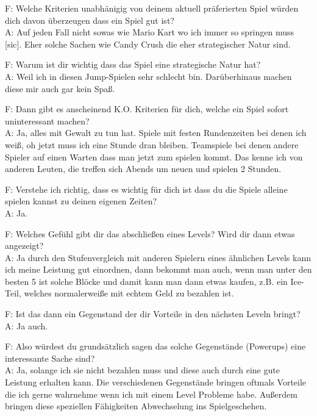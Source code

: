 \documentclass[12pt, a4paper]{article}
\begin{document}
\begin{flushleft}
F: Welche Kriterien unabhänigig von deinem aktuell präferierten Spiel würden dich davon überzeugen dass ein Spiel gut ist?\\
A: Auf jeden Fall nicht sowas wie Mario Kart wo ich immer so springen muss [sic]. Eher solche Sachen wie Candy Crush die eher strategischer Natur sind.\newline

F: Warum ist dir wichtig dass das Spiel eine strategische Natur hat?\\
A: Weil ich in diesen Jump-Spielen sehr schlecht bin. Darüberhinaus machen diese mir auch gar kein Spaß.\newline

F: Dann gibt es anscheinend K.O. Kriterien für dich, welche ein Spiel sofort uninteressant machen?\\
A: Ja, alles mit Gewalt zu tun hat. Spiele mit festen Rundenzeiten bei denen ich weiß, oh jetzt muss ich eine Stunde dran bleiben. Teamspiele bei denen andere Spieler auf einen Warten dass man jetzt zum spielen kommt. Das kenne ich von anderen Leuten, die treffen sich Abends um neuen und spielen 2 Stunden.\newline

F: Verstehe ich richtig, dass es wichtig für dich ist dass du die Spiele alleine spielen kannst zu deinen eigenen Zeiten?\\
A: Ja.\newline

F: Welches Gefühl gibt dir das abschließen eines Levels? Wird dir dann etwas angezeigt?\\
A: Ja durch den Stufenvergleich mit anderen Spielern eines ähnlichen Levels kann ich meine Leistung gut einordnen, dann bekommt man auch, wenn man unter den besten 5 ist solche Blöcke und damit kann man dann etwas kaufen, z.B. ein Ice-Teil, welches normalerweiße mit echtem Geld zu bezahlen ist.\newline

F: Ist das dann ein Gegenstand der dir Vorteile in den nächsten Leveln bringt?\\
A: Ja auch.\newline

F: Also würdest du grundsätzlich sagen das solche Gegenstände (Powerups) eine interessante Sache sind?\\
A: Ja, solange ich sie nicht bezahlen muss und diese auch durch eine gute Leistung erhalten kann. Die verschiedenen Gegenstände bringen oftmals Vorteile die ich gerne wahrnehme wenn ich mit einem Level Probleme habe. Außerdem bringen diese speziellen Fähigkeiten Abwechselung ins Spielgeschehen.\newline


\end{flushleft}
\end{document}
